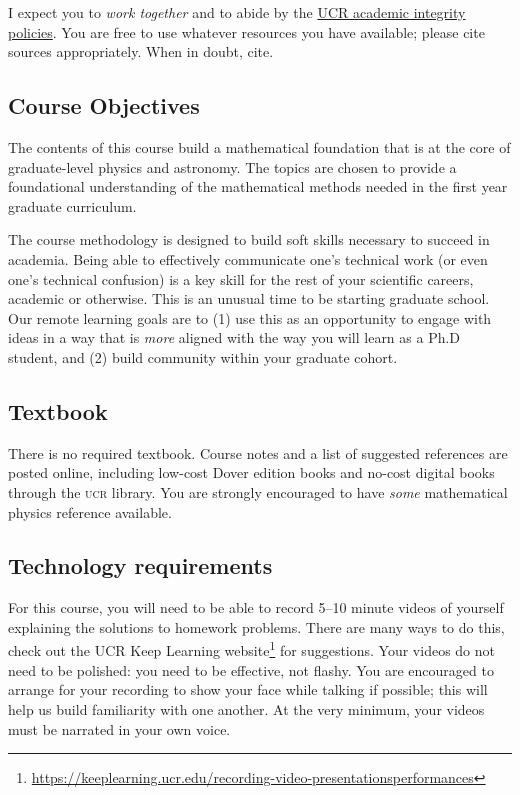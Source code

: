 \documentclass[12pt]{article}
\numberwithin{equation}{section}    %
\begin{document}
I expect you to \emph{work together} and to abide by the \href{http://conduct.ucr.edu/policies/academicintegrity.html}{UCR academic integrity policies}. You are free to use whatever resources you have available; please cite sources appropriately. When in doubt, cite.

\subsection*{Course Objectives}

The contents of this course build a mathematical foundation that is at the core of graduate-level physics and astronomy. The topics are chosen to provide a foundational understanding of the mathematical methods needed in the first year graduate curriculum.

The course methodology is designed to build soft skills necessary to succeed in academia. Being able to effectively communicate one's technical work (or even one's technical confusion) is a key skill for the rest of your scientific careers, academic or otherwise.
%
This is an unusual time to be starting graduate school. Our remote learning goals are to (1) use this as an opportunity to engage with ideas in a way that is \emph{more} aligned with the way you will learn as a Ph.D student, and (2) build community within your graduate cohort. 


\subsection*{Textbook}

There is no required textbook. Course notes and a list of suggested references are posted online, including low-cost Dover edition books and no-cost digital books through the \textsc{ucr} library. You are strongly encouraged to have \emph{some} mathematical physics reference available.

\subsection*{Technology requirements}

For this course, you will need to be able to record 5--10 minute videos of yourself explaining the solutions to homework problems. There are many ways to do this, check out the UCR Keep Learning website\footnote{\url{https://keeplearning.ucr.edu/recording-video-presentationsperformances}} for suggestions. Your videos do not need to be polished: you need to be effective, not flashy. You are encouraged to arrange for your recording to show your face while talking if possible; this will help us build familiarity with one another. At the very minimum, your videos must be narrated in your own voice. 
\end{document}
